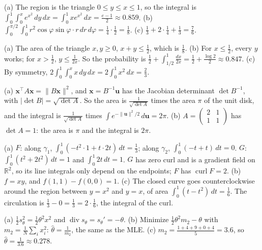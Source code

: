 \documentclass[11pt]{article}
\newcommand{\norm}[1]{\lVert #1 \rVert}
\DeclareMathOperator{\Div}{div}
\DeclareMathOperator{\curl}{curl}
\begin{document}
\begin{description}[leftmargin=0pt, itemsep=0.3em]
    \item[\ref{pr:fubini-practice}.] (a) The region is the triangle $0 \leq y \leq x \leq 1$, so the integral is $\int_0^1\int_0^x e^{x^2}\, dy\, dx = \int_0^1 xe^{x^2}\, dx = \frac{e - 1}{2} \approx 0.859$. (b) $\int_0^{\pi/2}\int_0^1 r^2\cos\varphi\sin\varphi \cdot r\, dr\, d\varphi = \frac{1}{4} \cdot \frac{1}{2} = \frac{1}{8}$. (c) $\frac{1}{3} + 2 \cdot \frac{1}{4} + \frac{1}{3} = \frac{7}{6}$.
    \item[\ref{pr:prob-integrals}.] (a) The area of the triangle $x, y \geq 0$, $x + y \leq \frac{1}{2}$, which is $\frac{1}{8}$. (b) For $x \leq \frac{1}{2}$, every $y$ works; for $x > \frac{1}{2}$, $y \leq \frac{1}{2x}$. So the probability is $\frac{1}{2} + \int_{1/2}^1 \frac{dx}{2x} = \frac{1}{2} + \frac{\log 2}{2} \approx 0.847$. (c) By symmetry, $2\int_0^1\int_0^x x\, dy\, dx = 2\int_0^1 x^2\, dx = \frac{2}{3}$.
    \item[\ref{pr:gauss-ellipse}.] (a) $\mathbf{x}^\top A\mathbf{x} = \norm{B\mathbf{x}}^2$, and $\mathbf{x} = B^{-1}\mathbf{u}$ has the Jacobian determinant $\det B^{-1}$, with $|\det B| = \sqrt{\det A}$. So the area is $\frac{1}{\sqrt{\det A}}$ times the area $\pi$ of the unit disk, and the integral is $\frac{1}{\sqrt{\det A}}$ times $\int e^{-\norm{\mathbf{u}}^2/2}\, d\mathbf{u} = 2\pi$. (b) $A = \left(\begin{smallmatrix} 2 & 1 \\ 1 & 1 \end{smallmatrix}\right)$ has $\det A = 1$: the area is $\pi$ and the integral is $2\pi$.
    \item[\ref{pr:line-integrals}.] (a) $F$: along $\gamma_1$, $\int_0^1 (-t^2 \cdot 1 + t \cdot 2t)\, dt = \frac{1}{3}$; along $\gamma_2$, $\int_0^1 (-t + t)\, dt = 0$. $G$: $\int_0^1 (t^2 + 2t^2)\, dt = 1$ and $\int_0^1 2t\, dt = 1$. $G$ has zero curl and is a gradient field on $\mathbb{R}^2$, so its line integrals only depend on the endpoints; $F$ has $\curl F = 2$. (b) $f = xy$, and $f(1, 1) - f(0, 0) = 1$. (c) The closed curve goes counterclockwise around the region between $y = x^2$ and $y = x$, of area $\int_0^1 (t - t^2)\, dt = \frac{1}{6}$. The circulation is $\frac{1}{3} - 0 = \frac{1}{3} = 2 \cdot \frac{1}{6}$, the integral of the curl.
    \item[\ref{pr:score-matching-1d}.] (a) $\frac{1}{2}s_\theta^2 = \frac{1}{2}\theta^2x^2$ and $\Div s_\theta = s_\theta' = -\theta$. (b) Minimize $\frac{1}{2}\theta^2 m_2 - \theta$ with $m_2 = \frac{1}{N}\sum_i x_i^2$: $\hat\theta = \frac{1}{m_2}$, the same as the MLE. (c) $m_2 = \frac{1 + 4 + 9 + 0 + 4}{5} = 3.6$, so $\hat\theta = \frac{1}{3.6} \approx 0.278$.

\end{description}
\end{document}
